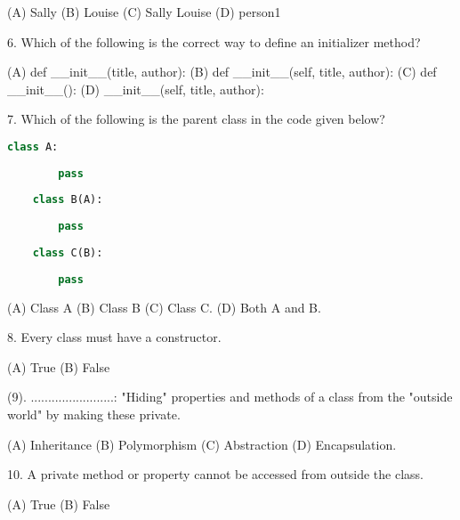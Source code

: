 \documentclass[6pt]{article}
\begin{document}
(A)  Sally         (B)  Louise        (C)     Sally Louise     (D)  person1

\vspace{20pt}

6. Which of the following is the correct way to define an initializer method?
\vspace{20pt}

(A) def \_\_init\_\_(title, author): (B) def \_\_init\_\_(self, title, author): (C) def \_\_init\_\_(): (D) \_\_init\_\_(self, title, author):

\vspace{20pt}
7. Which of the following is the parent class in the code given below?
\begin{center}
\begin{lstlisting}[language=Python]
	class A:
	
	    pass 
	
	class B(A):
	
	    pass 
	
	class C(B):
	
	    pass
   \end{lstlisting}
\end{center} 
\vspace{20pt}

(A) Class A   (B)  Class B   (C) Class C.   (D) Both A and B.

\vspace{20pt}
8.  Every class must have a constructor.
\vspace{20pt}

(A) True (B) False

\vspace{20pt}


(9). ........................: "Hiding" properties and methods of a class from the "outside world" by making these private.
\vspace{20pt}

(A) Inheritance   (B)  Polymorphism   (C) Abstraction   (D) Encapsulation.


\vspace{20pt}
10. A private method or property cannot be accessed from outside the class.
\vspace{20pt}

(A) True (B) False
\end{document}
